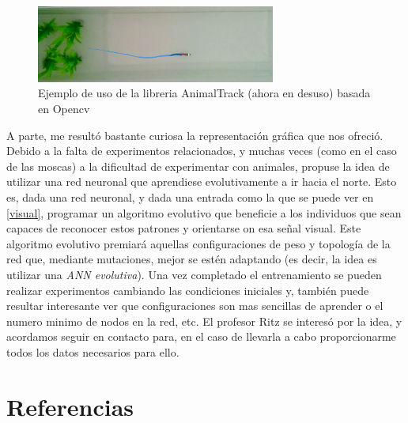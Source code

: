 \documentclass[1p]{elsarticle}
\begin{document}
\begin{figure}
	\centering
	\includegraphics[width=0.7\textwidth]{animal_track}
	\caption{Ejemplo de uso de la libreria AnimalTrack (ahora en desuso) basada en Opencv}
	\label{animal_1}
\end{figure}

A parte, me resultó bastante curiosa la representación gráfica que nos ofreció. Debido a la falta de experimentos relacionados, y muchas veces (como en el caso de las moscas) a la dificultad de experimentar con animales, propuse la idea de utilizar una red neuronal que aprendiese evolutivamente a ir hacia el norte. Esto es, dada una red neuronal, y dada una entrada como la que se puede ver en \ref{visual}, programar un algoritmo evolutivo que beneficie a los individuos que sean capaces de reconocer estos patrones y orientarse on esa señal visual. Este algoritmo evolutivo premiará aquellas configuraciones de peso y topología de la red que, mediante mutaciones, mejor se estén adaptando (es decir, la idea es utilizar una \textit{ANN evolutiva}). Una vez completado el entrenamiento se pueden realizar experimentos cambiando las condiciones iniciales y, también puede resultar interesante ver que configuraciones son mas sencillas de aprender o el numero minimo de nodos en la red, etc. 
El profesor Ritz se interesó por la idea, y acordamos seguir en contacto para, en el caso de llevarla a cabo proporcionarme todos los datos necesarios para ello.



\section*{Referencias}


\end{document}
